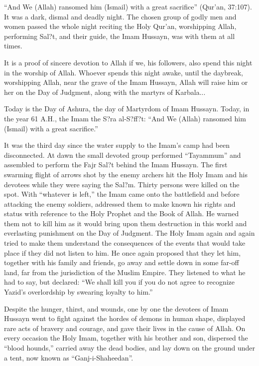 \begin{quotationx}
``And We (Allah) ransomed him (Ismail) with a great sacrifice'' (Qur'an, 37:107). It was a dark, dismal and deadly night. The chosen group of godly men and women passed the whole night reciting the Holy Qur'an, worshipping Allah, performing Sal?t, and their guide, the Imam Hussayn, was with them at all times.

It is a proof of sincere devotion to Allah if we, his followers, also spend this night in the worship of Allah. Whoever spends this night awake, until the daybreak, worshipping Allah, near the grave of the Imam Hussayn, Allah will raise him or her on the Day of Judgment, along with the martyrs of Karbala...
\end{quotationx}

Today is the Day of Ashura, the day of Martyrdom of Imam Hussayn. Today, in the year 61 A.H., the Imam the S?ra al-S?ff?t: ``And We (Allah) ransomed him (Ismail) with a great sacrifice.''

It was the third day since the water supply to the Imam's camp had been disconnected. At dawn the small devoted group performed ``Tayammum'' and assembled to perform the Fajr Sal?t behind the Imam Hussayn. The first swarming flight of arrows shot by the enemy archers hit the Holy Imam and his devotees while they were saying the Sal?m. Thirty persons were killed on the spot. With ``whatever is left,'' the Imam came onto the battlefield and before attacking the enemy soldiers, addressed them to make known his rights and status with reference to the Holy Prophet and the Book of Allah. He warned them not to kill him as it would bring upon them destruction in this world and everlasting punishment on the Day of Judgment. The Holy Imam again and again tried to make them understand the consequences of the events that would take place if they did not listen to him. He once again proposed that they let him, together with his family and friends, go away and settle down in some far-off land, far from the jurisdiction of the Muslim Empire. They listened to what he had to say, but declared: ``We shall kill you if you do not agree to recognize Yazid's overlordship by swearing loyalty to him.''

Despite the hunger, thirst, and wounds, one by one the devotees of Imam Hussayn went to fight against the hordes of demons in human shape, displayed rare acts of bravery and courage, and gave their lives in the cause of Allah. On every occasion the Holy Imam, together with his brother and son, dispersed the ``blood hounds,'' carried away the dead bodies, and lay down on the ground under a tent, now known as ``Ganj-i-Shaheedan''.

